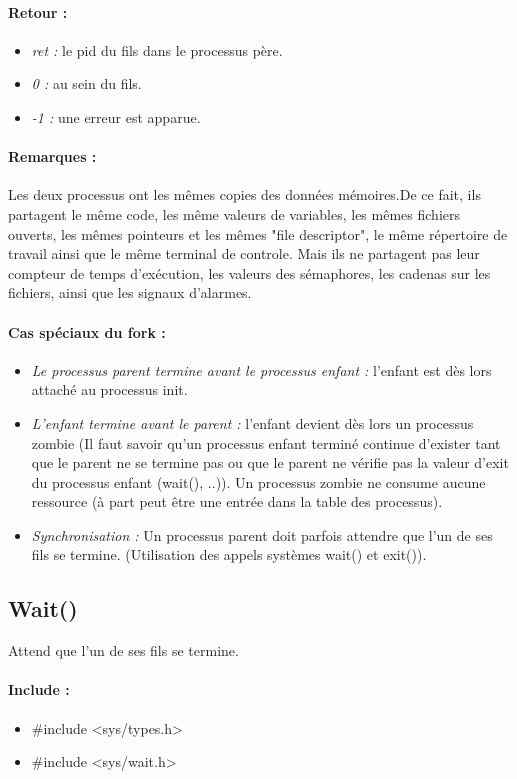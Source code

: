 \documentclass{article}[12pt]
\begin{document}
\paragraph{Retour : }
\begin{itemize}
	\item \emph{ret : } le pid du fils dans le processus père.
	\item \emph{0 : } au sein du fils.
	\item \emph{-1 : } une erreur est apparue.
\end{itemize}
\paragraph{Remarques : }
Les deux processus ont les mêmes copies des données mémoires.De ce fait, ils partagent le même code, les même valeurs de variables, les mêmes fichiers ouverts, les mêmes pointeurs et les mêmes "file descriptor", le même répertoire de travail ainsi que le même terminal de controle. Mais ils ne partagent pas leur compteur de temps d'exécution, les valeurs des sémaphores, les cadenas sur les fichiers, ainsi que les signaux d'alarmes.
\paragraph{Cas spéciaux du fork : }
\begin{itemize}
\item \emph{Le processus parent termine avant le processus enfant :} l'enfant est dès lors attaché au processus init.
\item \emph{L'enfant termine avant le parent :} l'enfant devient dès lors un processus zombie (Il faut savoir qu'un processus enfant terminé continue d'exister tant que le parent ne se termine pas ou que le parent ne vérifie pas la valeur d'exit du processus enfant (wait(), ..)). Un processus zombie ne consume aucune ressource (à part peut être une entrée dans la table des processus).
\item \emph{Synchronisation :} Un processus parent doit parfois attendre que l'un de ses fils se termine. (Utilisation des appels systèmes wait() et exit()).
\end{itemize}
\subsection{Wait()}
Attend que l'un de ses fils se termine.
\paragraph{Include : }
\begin{itemize}
	\item \#include <sys/types.h>
    \item \#include <sys/wait.h>
\end{itemize}
\end{document}
